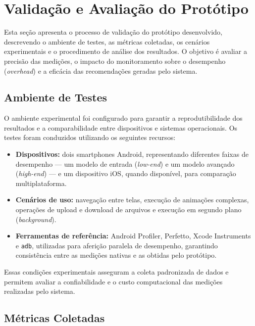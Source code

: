 \documentclass[12pt,a4paper,oneside]{abntex2}
\begin{document}
\chapter{Validação e Avaliação do Protótipo}

Esta seção apresenta o processo de validação do protótipo desenvolvido, descrevendo o ambiente de testes, as métricas coletadas, os cenários experimentais e o procedimento de análise dos resultados. O objetivo é avaliar a precisão das medições, o impacto do monitoramento sobre o desempenho (\textit{overhead}) e a eficácia das recomendações geradas pelo sistema.

\section{Ambiente de Testes}

O ambiente experimental foi configurado para garantir a reprodutibilidade dos resultados e a comparabilidade entre dispositivos e sistemas operacionais. Os testes foram conduzidos utilizando os seguintes recursos:

\begin{itemize}
  \item \textbf{Dispositivos:} dois smartphones Android, representando diferentes faixas de desempenho — um modelo de entrada (\textit{low-end}) e um modelo avançado (\textit{high-end}) — e um dispositivo iOS, quando disponível, para comparação multiplataforma.
  \item \textbf{Cenários de uso:} navegação entre telas, execução de animações complexas, operações de upload e download de arquivos e execução em segundo plano (\textit{background}).
  \item \textbf{Ferramentas de referência:} Android Profiler, Perfetto, Xcode Instruments e \texttt{adb}, utilizadas para aferição paralela de desempenho, garantindo consistência entre as medições nativas e as obtidas pelo protótipo.
\end{itemize}

Essas condições experimentais asseguram a coleta padronizada de dados e permitem avaliar a confiabilidade e o custo computacional das medições realizadas pelo sistema.

\section{Métricas Coletadas}
\end{document}
